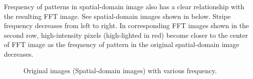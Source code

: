 Frequency of patterns in spatial-domain image also has a clear
relationship with the resulting FFT image. See spatial-domain images
shown in below. Stripe frequency decreases from left to right. In
corresponding FFT images shown in the second row, high-intensity pixels
(high-lighted in red) become closer to the center of FFT image as the
frequency of pattern in the original spatial-domain image decreases. 

\begin{figure}[htbp]
 \centering
 \caption{ Original images (Spatial-domain images) with various frequency.}
 \label{fig:FFTOriginalStripesFrequencies}
\end{figure} 

